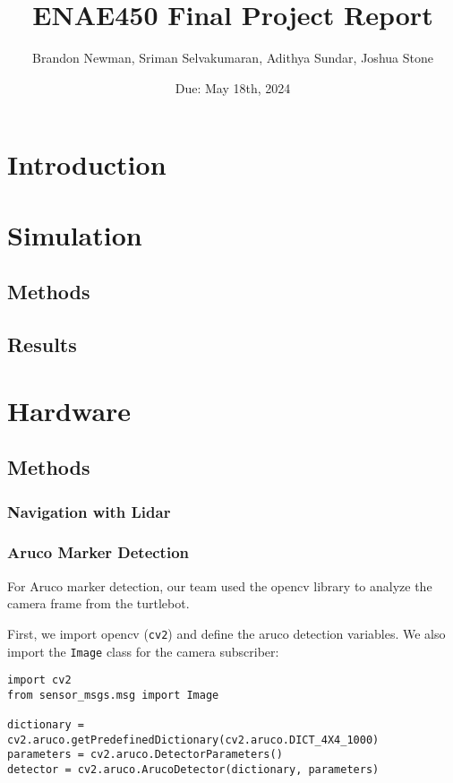 \documentclass{article}
\title{ENAE450 Final Project Report}
\author{Brandon Newman, Sriman Selvakumaran, Adithya Sundar, Joshua Stone}
\date{Due: May 18th, 2024}
\begin{document}
\maketitle

\section{Introduction}

\section{Simulation}

\subsection{Methods}

\subsection{Results}

\section{Hardware}

\subsection{Methods}

\subsubsection{Navigation with Lidar}

\subsubsection{Aruco Marker Detection}

For Aruco marker detection, our team used the opencv library to analyze the camera frame from the turtlebot. \par

First, we import opencv (\verb|cv2|) and define the aruco detection variables. We also import the \verb|Image| class for the camera subscriber:

\begin{lstlisting}
import cv2
from sensor_msgs.msg import Image

dictionary = cv2.aruco.getPredefinedDictionary(cv2.aruco.DICT_4X4_1000)
parameters = cv2.aruco.DetectorParameters()
detector = cv2.aruco.ArucoDetector(dictionary, parameters)
\end{lstlisting}
\end{document}
